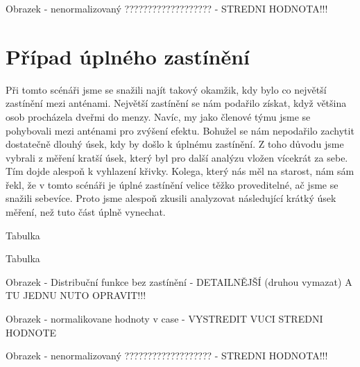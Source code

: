 Obrazek - nenormalizovaný ??????????????????? - STREDNI HODNOTA!!!

\section{Případ úplného zastínění}
Při tomto scénáři jsme se snažili najít takový okamžik, kdy bylo co největší zastínění mezi anténami. Největší zastínění se nám podařilo získat, když většina osob procházela dveřmi do menzy. Navíc, my jako členové týmu jsme se pohybovali mezi anténami pro zvýšení efektu. Bohužel se nám nepodařilo zachytit dostatečně dlouhý úsek, kdy by došlo k úplnému zastínění. Z toho důvodu jsme vybrali z měření kratší úsek, který byl pro další analýzu vložen vícekrát za sebe. Tím dojde alespoň k vyhlazení křivky. Kolega, který nás měl na starost, nám sám řekl, že v tomto scénáři je úplné zastínění velice těžko proveditelné, ač jsme se snažili sebevíce. Proto jsme alespoň zkusili analyzovat následující krátký úsek měření, než tuto část úplně vynechat. 

Tabulka

Tabulka

Obrazek - Distribuční funkce bez zastínění - DETAILNĚJŠÍ (druhou vymazat) A TU JEDNU NUTO OPRAVIT!!!

Obrazek - normalikovane hodnoty v case - VYSTREDIT VUCI STREDNI HODNOTE

Obrazek - nenormalizovaný ??????????????????? - STREDNI HODNOTA!!!




